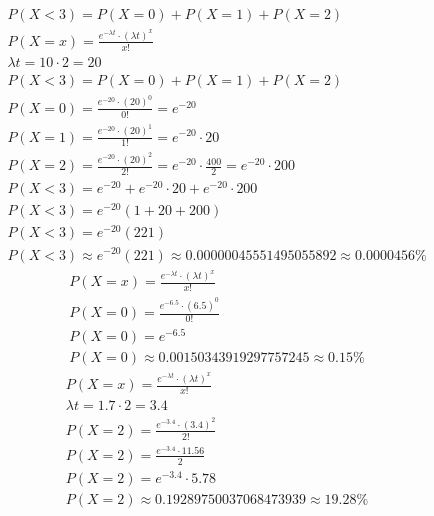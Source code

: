 \documentclass{jhwhw}
\begin{document}
\begin{gather*}
	P(X < 3) = P(X = 0) + P(X = 1) + P(X = 2) \\
	P(X = x) = \frac{e^{-\lambda t} \cdot \left(\lambda t\right)^x}{x!} \\
	\lambda t = 10 \cdot 2 = 20 \\
	P(X < 3) = P(X = 0) + P(X = 1) + P(X = 2) \\
	P(X = 0) = \frac{e^{-20} \cdot (20)^0}{0!} = e^{-20} \\
	P(X = 1) = \frac{e^{-20} \cdot (20)^1}{1!} = e^{-20} \cdot 20 \\
	P(X = 2) = \frac{e^{-20} \cdot (20)^2}{2!} = e^{-20} \cdot \frac{400}{2} = e^{-20} \cdot 200\\
	P(X < 3) = e^{-20} + e^{-20} \cdot 20 + e^{-20} \cdot 200\\
	P(X < 3) = e^{-20}(1 + 20 + 200)\\
	P(X < 3) = e^{-20}(221)\\
  P(X < 3) \approx e^{-20}(221)\approx{0.00000045551495055892} \approx 0.0000456\% 
\end{gather*}
\begin{gather*}
  P(X = x) = \frac{e^{-\lambda t} \cdot \left(\lambda t\right)^x}{x!}\\
  P(X = 0) = \frac{e^{-6.5} \cdot (6.5)^0}{0!} \\
  P(X = 0) = e^{-6.5} \\
  P(X = 0) \approx 0.00150343919297757245 \approx \boxed{0.15\%}
\end{gather*}
\begin{gather*}
  P(X = x) = \frac{e^{-\lambda t} \cdot \left(\lambda t\right)^x}{x!}\\
  \lambda t = 1.7 \cdot 2 = 3.4\\
  P(X = 2) = \frac{e^{-3.4} \cdot (3.4)^2}{2!} \\
  P(X = 2) = \frac{e^{-3.4} \cdot 11.56}{2} \\
  P(X = 2) = e^{-3.4} \cdot 5.78\\
  P(X = 2) \approx 0.19289750037068473939 \approx \boxed{19.28\%}
\end{gather*}
\newpage
\end{document}
